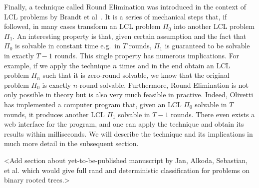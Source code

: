 Finally, a technique called Round Elimination was introduced in the context
of LCL problems by Brandt et al~\cite{Brandt2019}. It is a series of mechanical
steps that, if followed, in many cases transform an LCL problem $\Pi_0$ into another LCL problem $\Pi_1$. An interesting property is that, given certain assumption and the fact that
$\Pi_0$ is solvable in constant time e.g.\ in $T$ rounds, $\Pi_1$ is guaranteed to be
solvable in exactly $T - 1$ rounds. This single property has numerous implications.
For example, if we apply the technique $n$ times and in the end obtain an LCL problem $\Pi_n$
such that it is zero-round solvable, we know that the original problem $\Pi_0$ is
exactly $n$-round solvable. Furthermore, Round Elimination is not only possible
in theory but is also very much feasible in practive. Indeed, Olivetti has
implemented a computer program that, given an LCL $\Pi_0$ solvable in $T$ rounds,
it produces another LCL $\Pi_1$ solvable in $T - 1$ rounds. There even exists
a web interface for the program, and one can apply the technique and obtain
its results within milliseconds. We will describe the technique and its implications
in much more detail in the subsequent section.

<Add section about yet-to-be-published manuscript by Jan, Alkoda, Sebastian, et al.
which would give full rand and deterministic classification for problems on binary
rooted trees.>
